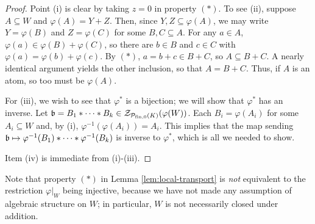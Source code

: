 \begin{proof}
	Point (i) is clear by taking $z = 0$ in property $(*)$.
	To see (ii), suppose $A\subseteq W$ and $\varphi(A) = Y+Z$.
	Then, since $Y,Z\subseteq \varphi(A)$, we may write $Y = \varphi(B)$ and $Z = \varphi(C)$ for some $B,C\subseteq A$.
	For any $a\in A$, $\varphi(a) \in \varphi(B) + \varphi(C)$, so there are $b\in B$ and $c\in C$ with $\varphi(a) = \varphi(b) + \varphi(c)$.
	By $(*)$, $a = b + c \in B+C$, so $A \subseteq B + C$.
	A nearly identical argument yields the other inclusion, so that $A = B+C$.
	Thus, if $A$ is an atom, so too must be $\varphi(A)$. 
	
	For (iii), we wish to see that $\varphi^*$ is a bijection; we will show that $\varphi^*$ has an inverse.
	Let $\mathfrak{b} = B_1 * \cdots * B_k\in \mathcal{Z}_{\mathcal{P}_{\textrm{fin}, 0}(K)}(\varphi(W))$.
	Each $B_i = \varphi(A_i)$ for some $A_i\subseteq W$ and, by (i), $\varphi^{-1}(\varphi(A_i)) = A_i$.
	This implies that the map sending $\mathfrak{b} \mapsto \varphi^{-1}(B_1) * \cdots * \varphi^{-1}(B_k)$ is inverse to $\varphi^*$, which is all we needed to show.
	
	Item (iv) is immediate from (i)-(iii).
\end{proof}

\begin{rk}
	Note that property $(*)$ in Lemma \ref{lem:local-transport} is \textit{not} equivalent to the restriction $\varphi|_W$ being injective, because we have not made any assumption of algebraic structure on $W$; in particular, $W$ is not necessarily closed under addition. 
\end{rk}

